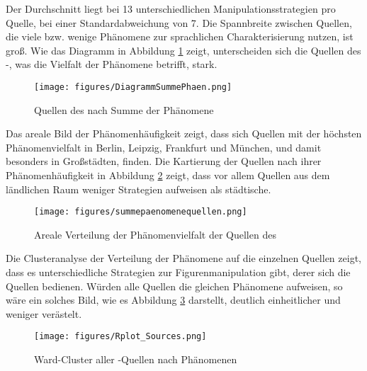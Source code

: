 \newpage 
Der Durchschnitt liegt bei 13 unterschiedlichen Manipulationsstrategien pro Quelle, bei einer Standardabweichung von 7.  Die Spannbreite zwischen Quellen, die viele bzw. wenige Phänomene zur sprachlichen Charakterisierung nutzen, ist groß. Wie das Diagramm in Abbildung \ref{DiagrammSummePhaen} zeigt, unterscheiden sich die Quellen des -, was die Vielfalt der Phänomene betrifft, stark. 
 
 \begin{figure}
\centering
\texttt{[image: figures/DiagrammSummePhaen.png]}
		\caption{\label{DiagrammSummePhaen} Quellen des  nach Summe der Phänomene}
	\end{figure}
 

 

Das areale Bild der Phänomenhäufigkeit zeigt, dass sich Quellen mit der höchsten Phänomenvielfalt in Berlin, Leipzig, Frankfurt und München, und damit besonders in Großstädten, finden. Die Kartierung der Quellen nach ihrer Phänomenhäufigkeit in Abbildung \ref{summepaenomenequellen} zeigt, dass vor allem Quellen aus dem ländlichen Raum weniger Strategien aufweisen als städtische. %

\begin{figure}
\centering
\texttt{[image: figures/summepaenomenequellen.png]}
		\caption{\label{summepaenomenequellen} Areale Verteilung der Phänomenvielfalt der Quellen des }
	\end{figure}
 


Die Clusteranalyse der Verteilung der Phänomene auf die einzelnen Quellen zeigt, dass es unterschiedliche Strategien zur Figurenmanipulation gibt, derer sich die Quellen bedienen. Würden alle Quellen die gleichen Phänomene aufweisen, so wäre ein solches Bild, wie es Abbildung \ref{boxplotcluster} darstellt, deutlich einheitlicher und weniger verästelt.
  
 
 \begin{figure}
\texttt{[image: figures/Rplot\_Sources.png]}
		\caption{\label{boxplotcluster} Ward-Cluster aller -Quellen nach Phänomenen}
	\end{figure}
 
